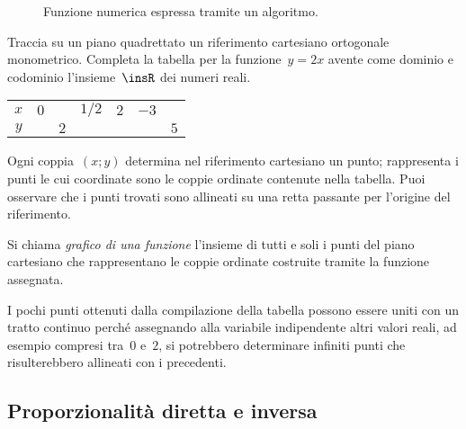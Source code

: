 \begin{inaccessibleblock}
 \begin{figure}[b]
\centering
\caption{Funzione numerica espressa tramite un algoritmo.}\label{fig:D.19}
\end{figure}
\end{inaccessibleblock}

\begin{exrig}
 \begin{esempio}
Traccia su un piano quadrettato un riferimento cartesiano ortogonale 
monometrico.
Completa la tabella per la funzione~\(y=2x\) avente come dominio e codominio 
l'insieme~\(\insR\) dei numeri reali.
\begin{center}
 \begin{tabular}{ccccccc}
 \toprule
 \(x\) & \(0\) && \(1/2\) & \(2\) & \(-3\) &\\
 \(y\) &&\(2\)&&&&\(5\)\\
 \bottomrule
 \end{tabular}
\end{center}
Ogni coppia~\((x;y)\) determina nel riferimento cartesiano un punto; rappresenta i 
punti le cui coordinate sono
le coppie ordinate contenute nella tabella. Puoi osservare che i punti trovati 
sono allineati su una retta passante
per l'origine del riferimento.
 \end{esempio}
\end{exrig}
\begin{definizione}
 Si chiama \emph{grafico di una funzione} l'insieme di tutti e soli i punti del 
piano cartesiano che
 rappresentano le coppie ordinate costruite tramite la funzione assegnata.
\end{definizione}
\osservazione
I pochi punti ottenuti dalla compilazione della tabella possono essere uniti con 
un tratto continuo perché
assegnando alla variabile indipendente altri valori reali, ad esempio compresi 
tra~\(0\) e~\(2\), si potrebbero
determinare infiniti punti che risulterebbero allineati con i precedenti.


\subsection{Proporzionalità diretta e inversa}
\label{subsec:fun_proporzionalita}

